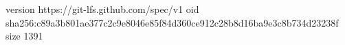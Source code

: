 version https://git-lfs.github.com/spec/v1
oid sha256:c89a3b801ae377c2c9e8046e85f84d360ce912c28b8d16ba9e3c8b734d23238f
size 1391
